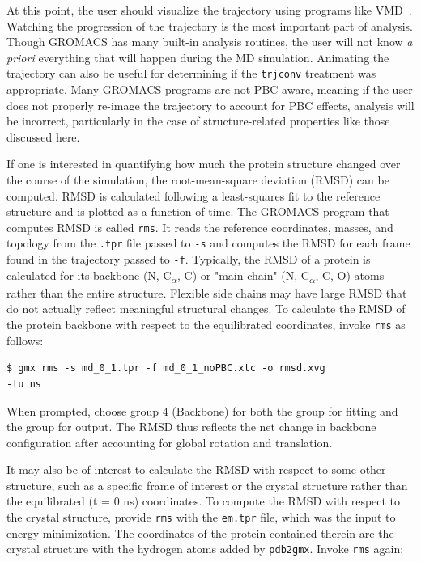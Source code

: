 \documentclass[9pt,tutorial]{livecoms}
\begin{document}
At this point, the user should visualize the trajectory using programs like VMD~\cite{Humphrey1996}. Watching the progression of the trajectory is the most important part of analysis. Though GROMACS has many built-in analysis routines, the user will not know {\em a priori} everything that will happen during the MD simulation. Animating the trajectory can also be useful for determining if the \texttt{trjconv} treatment was appropriate. Many GROMACS programs are not PBC-aware, meaning if the user does not properly re-image the trajectory to account for PBC effects, analysis will be incorrect, particularly in the case of structure-related properties like those discussed here.

If one is interested in quantifying how much the protein structure changed over the course of the simulation, the root-mean-square deviation (RMSD) can be computed. RMSD is calculated following a least-squares fit to the reference structure and is plotted as a function of time. The GROMACS program that computes RMSD is called \texttt{rms}. It reads the reference coordinates, masses, and topology from the \texttt{.tpr} file passed to \texttt{-s} and computes the RMSD for each frame found in the trajectory passed to \texttt{-f}. Typically, the RMSD of a protein is calculated for its backbone (N, C\textsubscript{$\alpha$}, C) or "main chain" (N, C\textsubscript{$\alpha$}, C, O) atoms rather than the entire structure. Flexible side chains may have large RMSD that do not actually reflect meaningful structural changes. To calculate the RMSD of the protein backbone with respect to the equilibrated coordinates, invoke \texttt{rms} as follows:

\begin{verbatim}
$ gmx rms -s md_0_1.tpr -f md_0_1_noPBC.xtc -o rmsd.xvg 
-tu ns
\end{verbatim}

When prompted, choose group 4 (Backbone) for both the group for fitting and the group for output. The RMSD thus reflects the net change in backbone configuration after accounting for global rotation and translation.

It may also be of interest to calculate the RMSD with respect to some other structure, such as a specific frame of interest or the crystal structure rather than the equilibrated (t = 0 ns) coordinates. To compute the RMSD with respect to the crystal structure, provide \texttt{rms} with the \texttt{em.tpr} file, which was the input to energy minimization. The coordinates of the protein contained therein are the crystal structure with the hydrogen atoms added by \texttt{pdb2gmx}. Invoke \texttt{rms} again:
\end{document}

